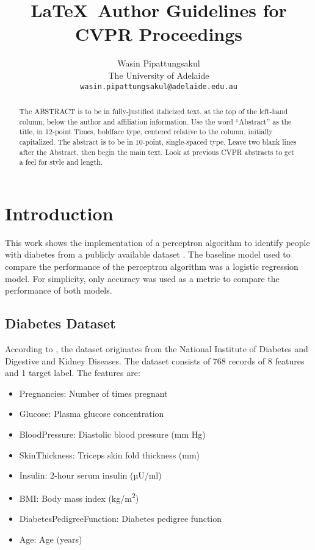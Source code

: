 \documentclass[10pt,twocolumn,letterpaper]{article}
\begin{document}
\title{\LaTeX\ Author Guidelines for CVPR Proceedings}

\author{Wasin Pipattungsakul \\
The University of Adelaide \\
{\tt\small wasin.pipattungsakul@adelaide.edu.au}
}

\maketitle

\begin{abstract}
  The ABSTRACT is to be in fully-justified italicized text, at the top
  of the left-hand column, below the author and affiliation
  information. Use the word ``Abstract'' as the title, in 12-point
  Times, boldface type, centered relative to the column, initially
  capitalized. The abstract is to be in 10-point, single-spaced type.
  Leave two blank lines after the Abstract, then begin the main text.
  Look at previous CVPR abstracts to get a feel for style and length.
\end{abstract}

\section{Introduction}

This work shows the implementation of a perceptron algorithm to identify people with diabetes from a publicly
available dataset \citep{data}. The baseline model used to compare the performance of the perceptron algorithm
was a logistic regression model. For simplicity, only accuracy was used as a metric to compare the performance
of both models.

\subsection{Diabetes Dataset}

According to \citet{data}, the dataset originates from the National Institute of Diabetes and Digestive and
Kidney Diseases. The dataset consists of 768 records of 8 features and 1 target label. The features are:

\begin{itemize}
  \item Pregnancies: Number of times pregnant
  \item Glucose: Plasma glucose concentration
  \item BloodPressure: Diastolic blood pressure (mm Hg)
  \item SkinThickness: Triceps skin fold thickness (mm)
  \item Insulin: 2-hour serum insulin (µU/ml)
  \item BMI: Body mass index (kg/m\textsuperscript{2})
  \item DiabetesPedigreeFunction: Diabetes pedigree function
  \item Age: Age (years)
\end{itemize}
\end{document}

